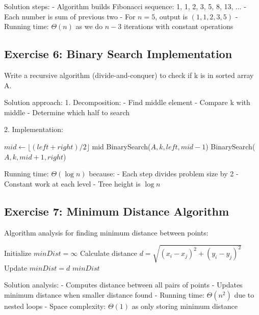 Solution steps:
- Algorithm builds Fibonacci sequence: 1, 1, 2, 3, 5, 8, 13, ...
- Each number is sum of previous two
- For $n = 5$, output is $(1, 1, 2, 3, 5)$
- Running time: $\Theta(n)$ as we do $n-3$ iterations with constant operations

\subsection{Exercise 6: Binary Search Implementation}

Write a recursive algorithm (divide-and-conquer) to check if k is in sorted array A.

Solution approach:
1. Decomposition:
   - Find middle element
   - Compare k with middle
   - Determine which half to search

2. Implementation:
\begin{algorithm}
\begin{algorithmic}[1]
    \State {}
\EndIf
\State $mid \gets \lfloor(left + right)/2\rfloor$
    \State \Return mid
    \State \Return BinarySearch($A, k, left, mid-1$)
\Else
    \State \Return BinarySearch($A, k, mid+1, right$)
\EndIf
\EndProcedure
\end{algorithmic}
\end{algorithm}

Running time: $\Theta(\log n)$ because:
- Each step divides problem size by 2
- Constant work at each level
- Tree height is $\log n$

\subsection{Exercise 7: Minimum Distance Algorithm}

Algorithm analysis for finding minimum distance between points:

\begin{algorithmic}[1]
\State Initialize $minDist = \infty$
    \State Calculate distance $d = \sqrt{(x_i-x_j)^2 + (y_i-y_j)^2}$
        \State Update $minDist = d$
    \EndIf
\EndFor
\State \Return $minDist$
\EndProcedure
\end{algorithmic}

Solution analysis:
- Computes distance between all pairs of points
- Updates minimum distance when smaller distance found
- Running time: $\Theta(n^2)$ due to nested loops
- Space complexity: $\Theta(1)$ as only storing minimum distance

